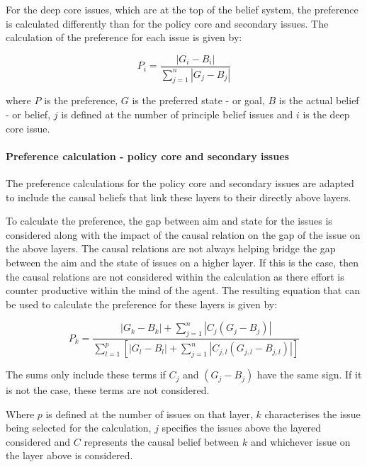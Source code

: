 \documentclass[11pt]{article}
\begin{document}
For the deep core issues, which are at the top of the belief system, the preference is calculated differently than for the policy core and secondary issues. The calculation of the preference for each issue is given by:

\begin{equation}
P_i = \frac{ |G_i - B_i|}{\sum_{j=1}^n |G_j - B_j|}
\end{equation}

where $P$ is the preference, $G$ is the preferred state - or goal, $B$ is the actual belief - or belief, $j$ is defined at the number of principle belief issues and $i$ is the deep core issue.


\paragraph{Preference calculation - policy core and secondary issues}

The preference calculations for the policy core and secondary issues are adapted to include the causal beliefs that link these layers to their directly above layers.

To calculate the preference, the gap between aim and state for the issues is considered along with the impact of the causal relation on the gap of the issue on the above layers. The causal relations are not always helping bridge the gap between the aim and the state of issues on a higher layer. If this is the case, then the causal relations are not considered within the calculation as there effort is counter productive within the mind of the agent. The resulting equation that can be used to calculate the preference for these layers is given by:

\begin{equation}\label{eq:preference2}
P_k = \frac{ |G_k - B_k| + \sum_{j=1}^n |C_j \left( G_j - B_j \right)|}{\sum_{l=1}^p \left[ |G_l - B_l| + \sum_{j=1}^n \left|C_{j,l} \left( G_{j,l} - B_{j,l} \right) \right| \right]}
\end{equation}

The sums only include these terms if $C_j$ and $\left( G_j - B_j \right)$ have the same sign. If it is not the case, these terms are not considered.

Where $p$ is defined at the number of issues on that layer, $k$ characterises the issue being selected for the calculation, $j$ specifies the issues above the layered considered and $C$ represents the causal belief between $k$ and whichever issue on the layer above is considered.
\end{document}
